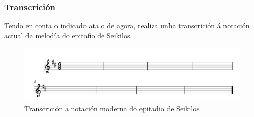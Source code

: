 \subsubsection*{Transcrición}

Tendo en conta o indicado ata o de agora, realiza unha transcrición á notación actual da melodía do epitafio de Seikilos.

\begin{figure}[htp]
\centering
\includegraphics[scale=0.90]{images/Seikilos-1.png}
\caption{Transcrición a notación moderna do epitadio de Seikilos}
\label{transcricion}
\end{figure}

